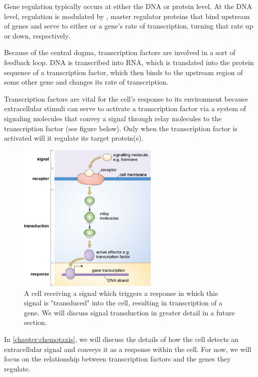 Gene regulation typically occurs at either the DNA or protein level. At the DNA level, regulation is modulated by , master regulator proteins that bind upstream of genes and serve to either  or  a gene's rate of transcription, turning that rate up or down, respectively.

Because of the central dogma, transcription factors are involved in a sort of feedback loop. DNA is transcribed into RNA, which is translated into the protein sequence of a transcription factor, which then binds to the upstream region of some other gene and changes its rate of transcription.

Transcription factors are vital for the cell's response to its environment because extracellular stimuli can serve to activate a transcription factor via a system of signaling molecules that convey a signal through relay molecules to the transcription factor (see figure below). Only when the transcription factor is activated will it regulate its target protein(s).

\begin{figure}[h]
\centering
\mySfFamily
\includegraphics[width = 0.6\textwidth]{../images/signal_pathway.jpg}
\caption{A cell receiving a signal which triggers a response in which this signal is "transduced" into the cell, resulting in transcription of a gene. We will discuss signal transduction in greater detail in a future section.}
\label{fig:genetic_code}
\end{figure}

In \autoref{chapter:chemotaxis}, we will discuss the details of how the cell detects an extracellular signal and conveys it as a response within the cell. For now, we will focus on the relationship between transcription factors and the genes they regulate.


